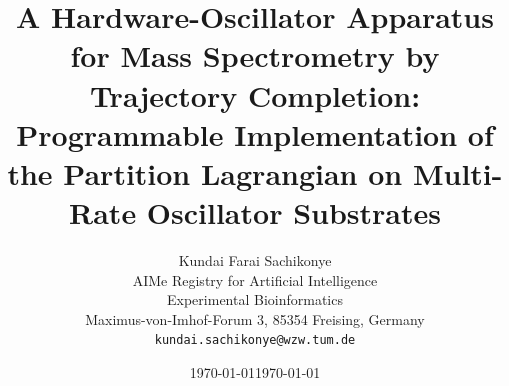 \documentclass[twocolumn,11pt,a4paper]{article}
\theoremstyle{definition}
\theoremstyle{remark}
\begin{document}
\title{\textbf{A Hardware-Oscillator Apparatus for Mass Spectrometry by Trajectory Completion: \\
\large Programmable Implementation of the Partition Lagrangian on Multi-Rate Oscillator Substrates}}


\author{Kundai Farai Sachikonye\\[2pt]
AIMe Registry for Artificial Intelligence\\
\small Experimental Bioinformatics\\
\small Maximus-von-Imhof-Forum 3, 85354 Freising, Germany\\
\small \texttt{kundai.sachikonye@wzw.tum.de}}
\date{\today}

\date{\today}

\maketitle
\end{document}
